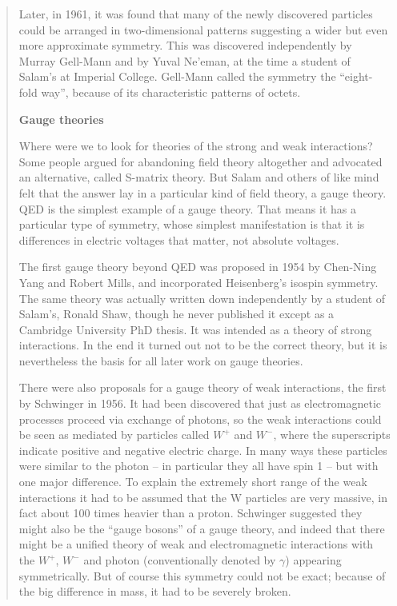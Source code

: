 \begin{quote}
Later, in 1961, it was found that many of the newly discovered particles could be arranged in two-dimensional patterns suggesting a wider but even more approximate symmetry. This was discovered independently by Murray Gell-Mann and by Yuval Ne’eman, at the time a student of Salam’s at Imperial College. Gell-Mann called the symmetry the “eight-fold way”, because of its characteristic patterns of octets.

\textbf{Gauge theories}

Where were we to look for theories of the strong and weak interactions? Some people argued for abandoning field theory altogether and advocated an alternative, called S-matrix theory. But Salam and others of like mind felt that the answer lay in a particular kind of field theory, a gauge theory. QED is the simplest example of a gauge theory. That means it has a particular type of symmetry, whose simplest manifestation is that it is differences in electric voltages that matter, not absolute voltages. 

The first gauge theory beyond QED was proposed in 1954 by Chen-Ning Yang and Robert Mills, and incorporated Heisenberg’s isospin symmetry. The same theory was actually written down independently by a student of Salam’s, Ronald Shaw, though he never published it except as a Cambridge University PhD thesis. It was intended as a theory of strong interactions. In the end it turned out not to be the correct theory, but it is nevertheless the basis for all later work on gauge theories.

There were also proposals for a gauge theory of weak interactions, the first by Schwinger in 1956. It had been discovered that just as electromagnetic processes proceed via exchange of photons, so the weak interactions could be seen as mediated by particles called $W^+$ and $W^-$, where the superscripts indicate positive and negative electric charge. In many ways these particles were similar to the photon -- in particular they all have spin 1 -- but with one major difference. To explain the extremely short range of the weak interactions it had to be assumed that the W particles are very massive, in fact about 100 times heavier than a proton. Schwinger suggested they might also be the “gauge bosons” of a gauge theory, and indeed that there might be a unified theory of weak and electromagnetic interactions with the $W^+$, $W^-$ and photon (conventionally denoted by $\gamma$) appearing symmetrically. But of course this symmetry could not be exact; because of the big difference in mass, it had to be severely broken.


\end{quote}
